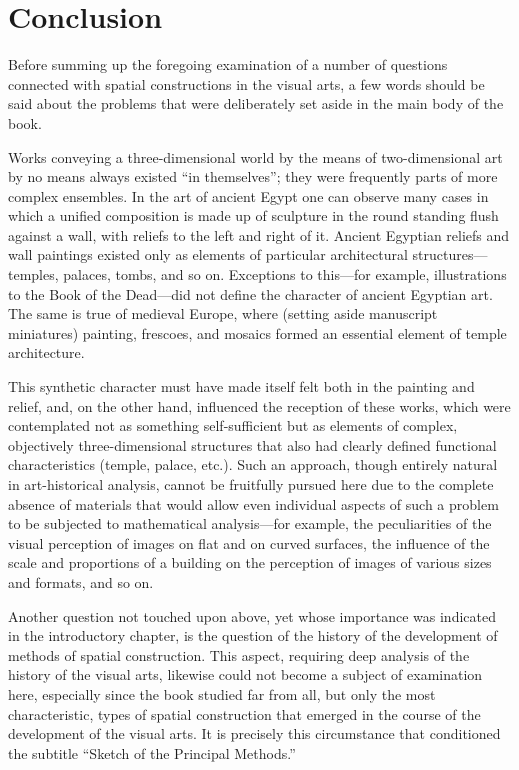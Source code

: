 
\chapter*{Conclusion}


Before summing up the foregoing examination of a number of questions connected with spatial
constructions in the visual arts, a few words should be said about the problems that were
deliberately set aside in the main body of the book.

Works conveying a three-dimensional world by the means of two-dimensional art by no means
always existed ``in themselves''; they were frequently parts of more complex ensembles.  In
the art of ancient Egypt one can observe many cases in which a unified composition is made
up of sculpture in the round standing flush against a wall, with reliefs to the left and
right of it.  Ancient Egyptian reliefs and wall paintings existed only as elements of
particular architectural structures---temples, palaces, tombs, and so on.  Exceptions
to this---for example, illustrations to the Book of the Dead---did not define the
character of ancient Egyptian art.  The same is true of medieval Europe, where (setting
aside manuscript miniatures) painting, frescoes, and mosaics formed an essential element
of temple architecture.

This synthetic character must have made itself felt both in the painting and relief, and,
on the other hand, influenced the reception of these works, which were contemplated not as
something self-sufficient but as elements of complex, objectively three-dimensional
structures that also had clearly defined functional characteristics (temple, palace, etc.).
Such an approach, though entirely natural in art-historical analysis, cannot be fruitfully
pursued here due to the complete absence of materials that would allow even individual
aspects of such a problem to be subjected to mathematical analysis---for example, the
peculiarities of the visual perception of images on flat and on curved surfaces, the
influence of the scale and proportions of a building on the perception of images of
various sizes and formats, and so on.

Another question not touched upon above, yet whose importance was indicated in the
introductory chapter, is the question of the history of the development of methods of
spatial construction.  This aspect, requiring deep analysis of the history of the visual
arts, likewise could not become a subject of examination here, especially since the book
studied far from all, but only the most characteristic, types of spatial construction
that emerged in the course of the development of the visual arts.  It is precisely this
circumstance that conditioned the subtitle ``Sketch of the Principal Methods.''

